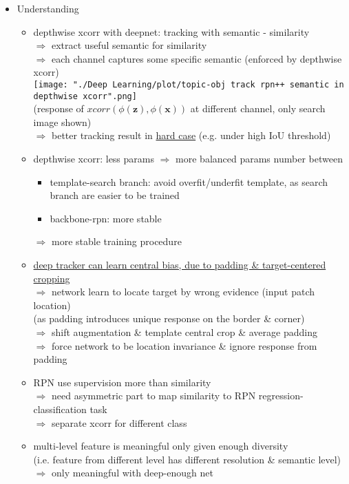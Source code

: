 \begin{itemize}
\begin{itemize}
	\item Understanding
		\begin{itemize}
		\item depthwise xcorr with deepnet: tracking with semantic - similarity \\
		$\Rightarrow$ extract useful semantic for similarity \\
		$\Rightarrow$ each channel captures some specific semantic (enforced by depthwise xcorr) \\
		\texttt{[image: "./Deep Learning/plot/topic-obj track rpn++ semantic in depthwise xcorr".png]} \\
		(response of $xcorr(\phi(\mathbf z), \phi(\mathbf x))$ at different channel, only search image shown) \\
		$\Rightarrow$ better tracking result in \underline{hard case} (e.g. under high IoU threshold)
		\item depthwise xcorr: less params $\Rightarrow$ more balanced params number between
			\begin{itemize}
			\item template-search branch: avoid overfit/underfit template, as search branch are easier to be trained
			\item backbone-rpn: more stable
			\end{itemize}
		$\Rightarrow$ more stable training procedure
		\item \underline{deep tracker can learn central bias, due to padding \& target-centered cropping} \\
		$\Rightarrow$ network learn to locate target by wrong evidence (input patch location) \\ 
		(as padding introduces unique response on the border \& corner) \\
		$\Rightarrow$ shift augmentation \& template central crop \& average padding \\
		$\Rightarrow$ force network to be location invariance \& ignore response from padding
		\item RPN use supervision more than similarity \\ 
		$\Rightarrow$ need asymmetric part to map similarity to RPN regression-classification task \\
		$\Rightarrow$ separate xcorr for different class
		\item multi-level feature is meaningful only given enough diversity \\
		(i.e. feature from different level has different resolution \& semantic level) \\
		$\Rightarrow$ only meaningful with deep-enough net
		\end{itemize}
	\end{itemize}


\end{itemize}
